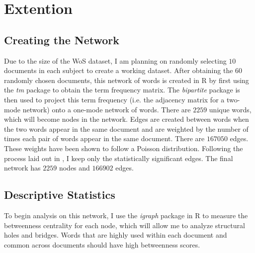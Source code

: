 \documentclass[12pt]{article}
\begin{document}
\section{Extention}
\subsection{Creating the Network}
Due to the size of the WoS dataset, I am planning on randomly selecting $10$ documents in each subject to create a working dataset. After obtaining the $60$ randomly chosen documents, this network of words is created in R by first using the \textit{tm} package to obtain the term frequency matrix. The \textit{bipartite} package is then used to project this term frequency (i.e. the adjacency matrix for a two-mode network) onto a one-mode network of words. There are $2259$ unique words, which will become nodes in the network. Edges are created between words when the two words appear in the same document and are weighted by the number of times each pair of words appear in the same document. There are $167050$ edges. These weights have been shown to follow a Poisson distribution. Following the process laid out in \cite{mainExtra}, I keep only the statistically significant edges. The final network has $2259$ nodes and $166902$ edges. 
  
\subsection{Descriptive Statistics}
To begin analysis on this network, I use the \textit{igraph} package in R to measure the betweenness centrality for each node, which will allow me to analyze structural holes and bridges. Words that are highly used within each document and common across documents should have high betweenness scores.
 
\end{document}
